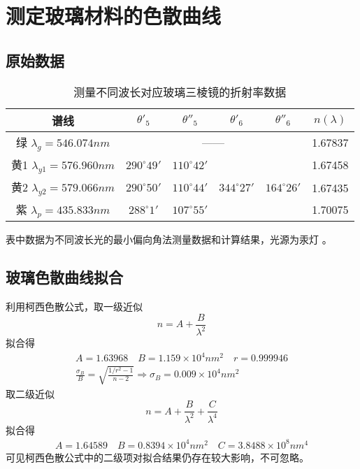 \documentclass[12pt, a4paper]{ctexart}
\begin{document}
\section{测定玻璃材料的色散曲线}
\subsection{原始数据}

\begin{table}[htbp]
  \centering
  \caption{测量不同波长对应玻璃三棱镜的折射率数据}
    \begin{tabular}{c|c|c|c|c|c}
    \toprule
    \multicolumn{1}{c}{谱线} & \multicolumn{1}{c}{$\theta'_5$} & \multicolumn{1}{c}{$\theta''_5$} & \multicolumn{1}{c}{$\theta'_6$} & \multicolumn{1}{c}{$\theta''_6$} & \multicolumn{1}{c}{$n(\lambda)$} \\
    \midrule
    绿 $\lambda_g = 546.074nm$ & \multicolumn{4}{|c|}{——} & 1.67837 \\
    \hline
    黄1 $\lambda_{y1} = 576.960nm$ & $290^{\circ}49'$ & $110^{\circ}42'$ & \multirow{3}{*}{$344^{\circ}27'$} & \multirow{3}{*}{$164^{\circ}26'$} & 1.67458 \\
    \cline{1-3}\cline{6-6}
    黄2 $\lambda_{y2} = 579.066nm$ & $290^{\circ}50'$ & $110^{\circ}44'$ &       &       & 1.67435 \\
    \cline{1-3}\cline{6-6}
    紫 $\lambda_p = 435.833nm$ & $288^{\circ}1'$ & $107^{\circ}55'$ &       &       & 1.70075 \\
    \bottomrule
    \end{tabular}
  \label{tab:t4}
\end{table}
表中数据为不同波长光的最小偏向角法测量数据和计算结果，光源为汞灯\footnotemark
{}。

\subsection{玻璃色散曲线拟合}
利用柯西色散公式，取一级近似
\[ n = A + \frac{B}{\lambda^2} \]
拟合得
\begin{gather*}
  A = 1.63968 \quad B = 1.159\times 10^{4} nm^2 \quad r = 0.999946\\
  \frac{\sigma_B}{B} = \sqrt{\frac{1/r^2 - 1}{n - 2}} \Rightarrow \sigma_B = 0.009\times 10^{4} nm^2
\end{gather*}
取二级近似
\[ n = A + \frac{B}{\lambda^2} + \frac{C}{\lambda^4} \]
拟合得
\begin{gather*}
  A = 1.64589 \quad B = 0.8394 \times 10^{4} nm^2 \quad C = 3.8488 \times 10^{8} nm^4
\end{gather*}
可见柯西色散公式中的二级项对拟合结果仍存在较大影响，不可忽略。
\end{document}
